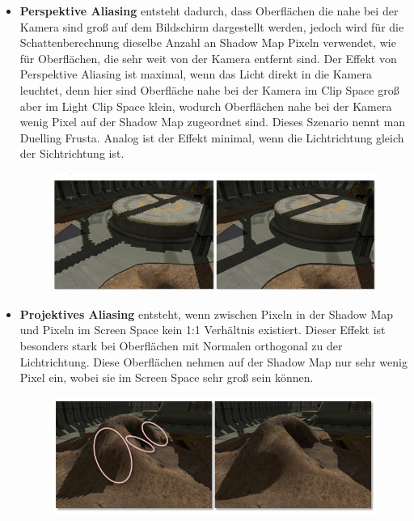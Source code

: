 \begin{itemize}
  \item \textbf{Perspektive Aliasing} entsteht dadurch, dass Oberflächen die nahe bei der Kamera sind groß auf dem 
    Bildschirm dargestellt werden, jedoch wird für die Schattenberechnung dieselbe Anzahl an Shadow Map Pixeln verwendet,
    wie für Oberflächen, die sehr weit von der Kamera entfernt sind. 
    Der Effekt von Perspektive Aliasing ist maximal, wenn das Licht direkt in die Kamera leuchtet, denn hier 
    sind Oberfläche nahe bei der Kamera im Clip Space groß aber im Light Clip Space klein, 
    wodurch Oberflächen nahe bei der Kamera wenig Pixel auf der Shadow Map zugeordnet sind. 
    Dieses Szenario nennt man Duelling Frusta. 
    Analog ist der Effekt minimal, wenn die Lichtrichtung gleich der Sichtrichtung ist.
    \begin{figure}[H]
      \begin{center}
        \includegraphics[width=1\textwidth]{res/img/perspective-aliasing1/image.jpg}
        \caption{}
        \label{fig:perspective-aliasing}
      \end{center}
    \end{figure}
  \item \textbf{Projektives Aliasing} entsteht, wenn zwischen Pixeln in der Shadow Map und Pixeln 
    im Screen Space kein 1:1 Verhältnis existiert. Dieser Effekt ist besonders stark bei Oberflächen
    mit Normalen orthogonal zu der Lichtrichtung. Diese Oberflächen nehmen auf der Shadow Map nur sehr wenig 
    Pixel ein, wobei sie im Screen Space sehr groß sein können. 
    \begin{figure}[H]
      \begin{center}
        \includegraphics[width=1\textwidth]{res/img/projective-aliasing/image.jpg}
        \caption{}
        \label{fig:projective-aliasing}
      \end{center}
    \end{figure}
\end{itemize}


